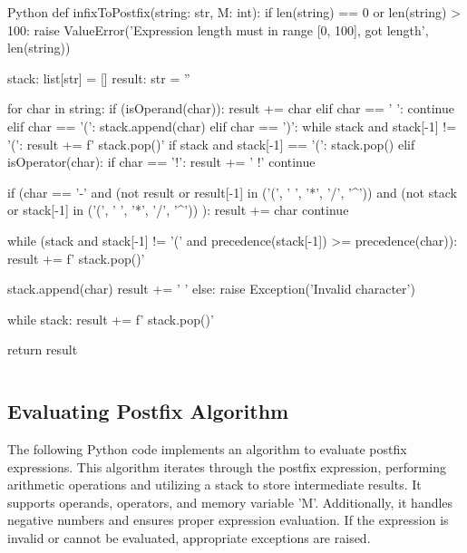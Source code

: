     \begin{code}{Python}
        def infixToPostfix(string: str, M: int):
            if len(string) == 0 or len(string) > 100:
                raise ValueError('Expression length must in range [0, 100], got length', len(string))
            
            stack: list[str] = []
            result: str = ''
            
            for char in string:
                if (isOperand(char)): result += char
                elif char == ' ': continue
                elif char == '(': stack.append(char)
                elif char == ')':
                    while stack and stack[-1] != '(': result += f' {stack.pop()}'
                    if stack and stack[-1] == '(': stack.pop()
                elif isOperator(char):
                    if char == '!':
                        result += ' !'
                        continue
                    
                    if (char == '-' 
                        and (not result or result[-1] in ('(', ' ', '*', '/', '^'))
                        and (not stack or stack[-1] in ('(', ' ', '*', '/', '^'))
                        ):
                        result += char
                        continue
                    
                    while (stack 
                           and stack[-1] != '(' 
                           and precedence(stack[-1]) >= precedence(char)):
                        result += f' {stack.pop()}'
                        
                    stack.append(char)
                    result += ' '
                else:
                    raise Exception('Invalid character')
        
            while stack: result += f' {stack.pop()}'
                
            return result
    \end{code}
    \begin{lstlisting}[language=Python, caption=Converting infix to postfix expression]
    \end{lstlisting}

\subsection{Evaluating Postfix Algorithm}
\label{sec:5.EVALUATE_POSTFIX}
    The following Python code implements an algorithm to evaluate postfix expressions.
    This algorithm iterates through the postfix expression, performing arithmetic operations and utilizing a stack to store intermediate results. It supports operands, operators, and memory variable 'M'. Additionally, it handles negative numbers and ensures proper expression evaluation. If the expression is invalid or cannot be evaluated, appropriate exceptions are raised.

